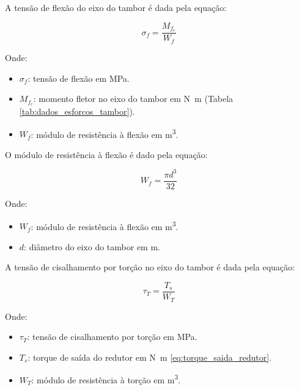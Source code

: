 A tensão de flexão do eixo do tambor é dada pela equação:

\begin{equation}
  \sigma_f = \frac{M_{f_e}}{W_f}
  \label{eq:tensao_flexao_eixo_do_tambor}
\end{equation}

Onde:

\begin{itemize}
  \item $\sigma_f$: tensão de flexão em \si{\mega\pascal}.
  \item $M_{f_e}$: momento fletor no eixo do tambor em \si{\newton\meter} (Tabela \ref{tab:dados_esforcos_tambor}).
  \item $W_f$: módulo de resistência à flexão em \si{\meter^3}.
\end{itemize}

\vspace{1em}

O módulo de resistência à flexão é dado pela equação:

\begin{equation}
  W_f = \frac{\pi d^3}{32}
  \label{eq:modulo_de_resistencia_a_flexao_eixo_do_tambor}
\end{equation}

Onde:

\begin{itemize}
  \item $W_f$: módulo de resistência à flexão em \si{\meter^3}.
  \item $d$: diâmetro do eixo do tambor em \si{\meter}.
\end{itemize}

\vspace{1em}

A tensão de cisalhamento por torção no eixo do tambor é dada pela equação:

\begin{equation}
  \tau_T = \frac{T_s}{W_T}
  \label{eq:tensao_cisalhamento_por_torcao_eixo_do_tambor}
\end{equation}

Onde:

\begin{itemize}
  \item $\tau_T$: tensão de cisalhamento por torção em \si{\mega\pascal}.
  \item $T_s$: torque de saída do redutor em \si{\newton\meter} \eqref{eq:torque_saida_redutor}.
  \item $W_T$: módulo de resistência à torção em \si{\meter^3}.
\end{itemize}

